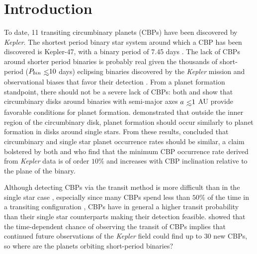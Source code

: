 

\section{Introduction} \label{STEEP:sec:intro}

To date, 11 transiting circumbinary planets (CBPs) have been discovered by {\it Kepler}.  The shortest period binary star system around which a CBP has been discovered is Kepler-47, with a binary period of 7.45 days \citep{Orosz2012}.  The lack of CBPs around shorter period binaries is probably real given the thousands of short-period ($P_{bin} \lsim 10$ days) eclipsing binaries discovered by the {\it Kepler} mission \citep{Kirk2016} and observational biases that favor their detection \citep{Munoz2015}.  From a planet formation standpoint, there should not be a severe lack of CBPs: both \citet{Alexander2012} and \citet{Vartanyan2016} show that circumbinary disks around binaries with semi-major axes $a \lsim 1$ AU provide favorable conditions for planet formation. \citet{Bromley2015} demonstrated that outside the inner region of the circumbinary disk, planet formation should occur similarly to planet formation in disks around single stars.  From these results, \citet{Bromley2015} concluded that circumbinary and single star planet occurrence rates should be similar, a claim bolstered by both \citet{Martin2014} and \citet{Armstrong2014} who find that the minimum CBP occurrence rate derived from {\it Kepler} data is of order $10\%$ and increases with CBP inclination relative to the plane of the binary.  

Although detecting CBPs via the transit method is more difficult than in the single star case \citep{Welsh2014,Winn2015}, especially since many CBPs spend less than $50 \%$ of the time in a transiting configuration \citep{Martin2017}, CBPs have in general a higher transit probability than their single star counterparts \citep{Martin2015a} making their detection feasible.  \citet{Martin2017} showed that the time-dependent chance of observing the transit of CBPs implies that continued future observations of the {\it Kepler} field could find up to 30 new CBPs, so where are the planets orbiting short-period binaries?

